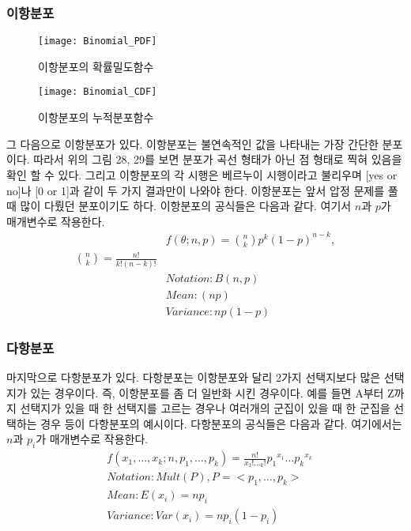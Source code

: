 \documentclass[a4paper]{oblivoir}
\begin{document}
\subsubsection{이항분포}
\begin{figure}[ht]\centering
\parbox[t]{5.2cm}{\texttt{[image: Binomial\_PDF]}\caption{이항분포의 확률밀도함수}\label{Fig:1-30}}\hspace{0.5cm}
\parbox[t]{5.2cm}{\texttt{[image: Binomial\_CDF]}\caption{이항분포의 누적분포함수}\label{Fig:1-31}}
\end{figure}
\indent 그 다음으로 이항분포가 있다. 이항분포는 불연속적인 값을 나타내는 가장 간단한 분포이다. 따라서 위의 그림 28, 29를 보면 분포가 곡선 형태가 아닌 점 형태로 찍혀 있음을 확인 할 수 있다. 그리고 이항분포의 각 시행은 베르누이 시행이라고 불리우며 [yes or no]나 [0 or 1]과 같이 두 가지 결과만이 나와야 한다. 이항분포는 앞서 압정 문제를 풀 때 많이 다뤘던 분포이기도 하다. 이항분포의 공식들은 다음과 같다. 여기서 $n$과 $p$가 매개변수로 작용한다.
\begin{align}
&f(\theta;n,p)={\binom{n}{k}}p^k(1-p)^{n-k},\\
{\binom{n}{k}}=\frac{n!}{k!(n-k)!}\label{eq:1-44}\\
&Notation:B(n,p)\label{eq:1-45}\\
&Mean:(np)\label{eq:1-46}\\
&Variance:np(1-p)\label{eq:1-47}
\end{align}

\subsubsection{다항분포}
\indent 마지막으로 다항분포가 있다. 다항분포는 이항분포와 달리 2가지 선택지보다 많은 선택지가 있는 경우이다. 즉, 이항분포를 좀 더 일반화 시킨 경우이다. 예를 들면 A부터 Z까지 선택지가 있을 때 한 선택지를 고르는 경우나 여러개의 군집이 있을 때 한 군집을 선택하는 경우 등이 다항분포의 예시이다. 다항분포의 공식들은 다음과 같다. 여기에서는 $n$과 $p_i$가 매개변수로 작용한다.
\begin{align}
&f(x_1,\ldots,x_k;n,p_1,\ldots,p_k)=\frac{n!}{x_1!\ldots_k!} {p_1}^{x_1}\ldots{p_k}^{x_k}\label{eq:1-48}\\
&Notation:Mult(P),P=<p_1,\ldots,p_k>\label{eq:1-49}\\
&Mean:E(x_i)=np_i\label{eq:1-50}\\
&Variance:Var(x_i)=np_i(1-p_i)\label{eq:1-51}
\end{align}
\end{document}
